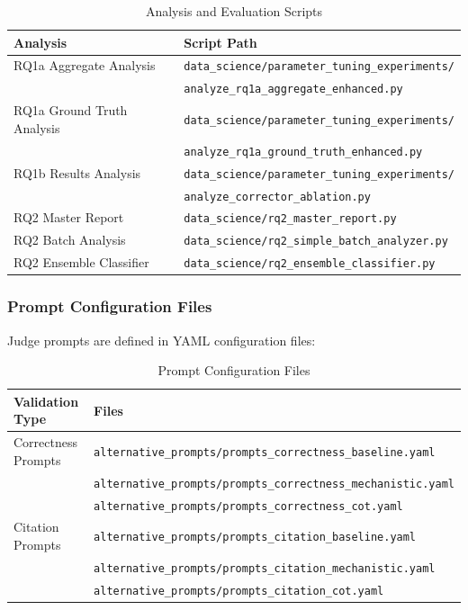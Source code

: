 \documentclass{article}
\begin{document}
\begin{table}[H]
\centering
\caption{Analysis and Evaluation Scripts}
\label{tab:analysis_scripts}
\begin{tabular}{ll}
\toprule
\textbf{Analysis} & \textbf{Script Path} \\
\midrule
RQ1a Aggregate Analysis & \texttt{data\_science/parameter\_tuning\_experiments/} \\
                        & \texttt{analyze\_rq1a\_aggregate\_enhanced.py} \\
RQ1a Ground Truth Analysis & \texttt{data\_science/parameter\_tuning\_experiments/} \\
                           & \texttt{analyze\_rq1a\_ground\_truth\_enhanced.py} \\
RQ1b Results Analysis & \texttt{data\_science/parameter\_tuning\_experiments/} \\
                      & \texttt{analyze\_corrector\_ablation.py} \\
RQ2 Master Report & \texttt{data\_science/rq2\_master\_report.py} \\
RQ2 Batch Analysis & \texttt{data\_science/rq2\_simple\_batch\_analyzer.py} \\
RQ2 Ensemble Classifier & \texttt{data\_science/rq2\_ensemble\_classifier.py} \\
\bottomrule
\end{tabular}
\end{table}

\subsubsection{Prompt Configuration Files}

Judge prompts are defined in YAML configuration files:

\begin{table}[H]
\centering
\caption{Prompt Configuration Files}
\label{tab:prompt_files}
\begin{tabular}{ll}
\toprule
\textbf{Validation Type} & \textbf{Files} \\
\midrule
Correctness Prompts & \texttt{alternative\_prompts/prompts\_correctness\_baseline.yaml} \\
                    & \texttt{alternative\_prompts/prompts\_correctness\_mechanistic.yaml} \\
                    & \texttt{alternative\_prompts/prompts\_correctness\_cot.yaml} \\
\addlinespace
Citation Prompts & \texttt{alternative\_prompts/prompts\_citation\_baseline.yaml} \\
                 & \texttt{alternative\_prompts/prompts\_citation\_mechanistic.yaml} \\
                 & \texttt{alternative\_prompts/prompts\_citation\_cot.yaml} \\
\bottomrule
\end{tabular}
\end{table}
\end{document}
